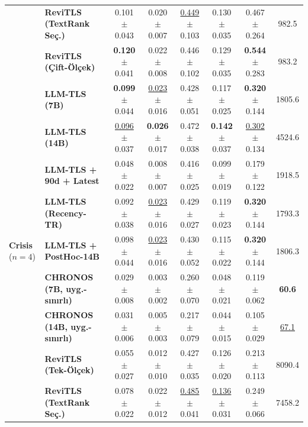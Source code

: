 ﻿\documentclass[journal]{IEEEtran}
\begin{document}
\begin{table}[t]
{\begin{tabular}{@{}llcccccc@{}}
  & \textbf{ReviTLS (TextRank Se\c{c}.)} & 0.101{\tiny$\pm$0.043} & 0.020{\tiny$\pm$0.007} & \underline{0.449}{\tiny$\pm$0.103} & 0.130{\tiny$\pm$0.035} & 0.467{\tiny$\pm$0.264} & 982.5 \\
  & \textbf{ReviTLS (\c{C}ift-\"{O}l\c{c}ek)} & \textbf{0.120}{\tiny$\pm$0.041} & 0.022{\tiny$\pm$0.008} & 0.446{\tiny$\pm$0.102} & 0.129{\tiny$\pm$0.035} & \textbf{0.544}{\tiny$\pm$0.283} & 983.2 \\
\midrule
\multirow{10}{*}{\textbf{Crisis} ($n=4$)}
  & \textbf{LLM-TLS (7B)}~\cite{hu2024moments} & \textbf{0.099}{\tiny$\pm$0.044} & \underline{0.023}{\tiny$\pm$0.016} & 0.428{\tiny$\pm$0.051} & 0.117{\tiny$\pm$0.025} & \textbf{0.320}{\tiny$\pm$0.144} & 1805.6 \\
  & \textbf{LLM-TLS (14B)} & \underline{0.096}{\tiny$\pm$0.037} & \textbf{0.026}{\tiny$\pm$0.017} & 0.472{\tiny$\pm$0.038} & \textbf{0.142}{\tiny$\pm$0.037} & \underline{0.302}{\tiny$\pm$0.134} & 4524.6 \\
  & \textbf{LLM-TLS + 90d + Latest} & 0.048{\tiny$\pm$0.022} & 0.008{\tiny$\pm$0.007} & 0.416{\tiny$\pm$0.025} & 0.099{\tiny$\pm$0.019} & 0.179{\tiny$\pm$0.122} & 1918.5 \\
  & \textbf{LLM-TLS (Recency-TR)} & 0.092{\tiny$\pm$0.038} & \underline{0.023}{\tiny$\pm$0.016} & 0.429{\tiny$\pm$0.027} & 0.119{\tiny$\pm$0.023} & \textbf{0.320}{\tiny$\pm$0.144} & 1793.3 \\
  & \textbf{LLM-TLS + PostHoc-14B} & 0.098{\tiny$\pm$0.044} & \underline{0.023}{\tiny$\pm$0.016} & 0.430{\tiny$\pm$0.052} & 0.115{\tiny$\pm$0.022} & \textbf{0.320}{\tiny$\pm$0.144} & 1806.3 \\
  & \textbf{CHRONOS (7B, uyg.-s{\i}n{\i}rl{\i})}~\cite{wu2025unfolding} & 0.029{\tiny$\pm$0.008} & 0.003{\tiny$\pm$0.002} & 0.260{\tiny$\pm$0.070} & 0.048{\tiny$\pm$0.021} & 0.119{\tiny$\pm$0.062} & \textbf{60.6} \\
  & \textbf{CHRONOS (14B, uyg.-s{\i}n{\i}rl{\i})} & 0.031{\tiny$\pm$0.006} & 0.005{\tiny$\pm$0.003} & 0.217{\tiny$\pm$0.079} & 0.044{\tiny$\pm$0.015} & 0.105{\tiny$\pm$0.029} & \underline{67.1} \\
  & \textbf{ReviTLS (Tek-\"{O}l\c{c}ek)} & 0.055{\tiny$\pm$0.027} & 0.012{\tiny$\pm$0.010} & 0.427{\tiny$\pm$0.035} & 0.126{\tiny$\pm$0.020} & 0.213{\tiny$\pm$0.113} & 8090.4 \\
  & \textbf{ReviTLS (TextRank Se\c{c}.)} & 0.078{\tiny$\pm$0.022} & 0.022{\tiny$\pm$0.012} & \underline{0.485}{\tiny$\pm$0.041} & \underline{0.136}{\tiny$\pm$0.031} & 0.249{\tiny$\pm$0.066} & 7458.2 \\

\end{tabular}}
\end{table}
\end{document}
